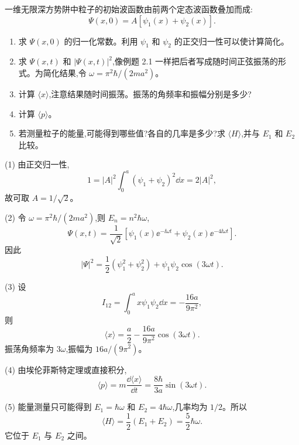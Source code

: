 \begin{question}
一维无限深方势阱中粒子的初始波函数由前两个定态波函数叠加而成:
\[
\Psi(x,0)=A[\psi_1(x)+\psi_2(x)] .
\]
\begin{enumerate}
\item 求 $\Psi(x,0)$ 的归一化常数。利用 $\psi_1$ 和 $\psi_2$ 的正交归一性可以使计算简化。
\item 求 $\Psi(x,t)$ 和 $|\Psi(x,t)|^2$,像例题 2.1 一样把后者写成随时间正弦振荡的形式。为简化结果,令 $\omega=\pi^2\hbar/(2ma^2)$。
\item 计算 $\langle x\rangle$,注意结果随时间振荡。振荡的角频率和振幅分别是多少?
\item 计算 $\langle p\rangle$。
\item 若测量粒子的能量,可能得到哪些值?各自的几率是多少?求 $\langle H\rangle$,并与 $E_1$ 和 $E_2$ 比较。
\end{enumerate}
\end{question}
\begin{solution}
(1) 由正交归一性,
\[
1=|A|^2\int_0^a(\psi_1+\psi_2)^2\dd x=2|A|^2,
\]
故可取 $A=1/\sqrt2$。

(2) 令 $\omega=\pi^2\hbar/(2ma^2)$,则 $E_n=n^2\hbar\omega$,
\[
\Psi(x,t)=\frac1{\sqrt2}\left[\psi_1(x)\ee^{-\ii\omega t}+\psi_2(x)\ee^{-4\ii\omega t}\right].
\]
因此
\[
|\Psi|^2=\frac12(\psi_1^2+\psi_2^2)+\psi_1\psi_2\cos(3\omega t).
\]

(3) 设
\[
I_{12}=\int_0^a x\psi_1\psi_2\dd x=-\frac{16a}{9\pi^2},
\]
则
\[
\langle x\rangle=\frac a2-\frac{16a}{9\pi^2}\cos(3\omega t).
\]
振荡角频率为 $3\omega$,振幅为 $16a/(9\pi^2)$。

(4) 由埃伦菲斯特定理或直接积分,
\[
\langle p\rangle=m\frac{\dd\langle x\rangle}{\dd t}
=\frac{8\hbar}{3a}\sin(3\omega t).
\]

(5) 能量测量只可能得到 $E_1=\hbar\omega$ 和 $E_2=4\hbar\omega$,几率均为 $1/2$。所以
\[
\langle H\rangle=\frac12(E_1+E_2)=\frac52\hbar\omega.
\]
它位于 $E_1$ 与 $E_2$ 之间。
\end{solution}

